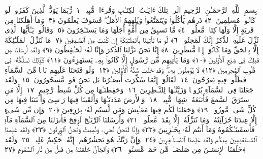 
  
    
  
    
    

\nopagebreak
  بِسمِ ٱللَّهِ ٱلرَّحمَـٰنِ ٱلرَّحِيمِ
  الٓر ۚ تِلكَ ءَايَـٰتُ ٱلكِتَـٰبِ وَقُرءَانٍۢ مُّبِينٍۢ ﴿١﴾
 رُّبَمَا يَوَدُّ ٱلَّذِينَ كَفَرُوا۟ لَو كَانُوا۟ مُسلِمِينَ ﴿٢﴾
 ذَرهُم يَأكُلُوا۟ وَيَتَمَتَّعُوا۟ وَيُلهِهِمُ ٱلأَمَلُ ۖ فَسَوفَ يَعلَمُونَ ﴿٣﴾
 وَمَآ أَهلَكنَا مِن قَريَةٍ إِلَّا وَلَهَا كِتَابٌۭ مَّعلُومٌۭ ﴿٤﴾
 مَّا تَسبِقُ مِن أُمَّةٍ أَجَلَهَا وَمَا يَستَـٔخِرُونَ ﴿٥﴾
 وَقَالُوا۟ يَـٰٓأَيُّهَا ٱلَّذِى نُزِّلَ عَلَيهِ ٱلذِّكرُ إِنَّكَ لَمَجنُونٌۭ ﴿٦﴾
 لَّو مَا تَأتِينَا بِٱلمَلَـٰٓئِكَةِ إِن كُنتَ مِنَ ٱلصَّـٰدِقِينَ ﴿٧﴾
 مَا نُنَزِّلُ ٱلمَلَـٰٓئِكَةَ إِلَّا بِٱلحَقِّ وَمَا كَانُوٓا۟ إِذًۭا مُّنظَرِينَ ﴿٨﴾
 إِنَّا نَحنُ نَزَّلنَا ٱلذِّكرَ وَإِنَّا لَهُۥ لَحَـٰفِظُونَ ﴿٩﴾
 وَلَقَد أَرسَلنَا مِن قَبلِكَ فِى شِيَعِ ٱلأَوَّلِينَ ﴿١٠﴾
 وَمَا يَأتِيهِم مِّن رَّسُولٍ إِلَّا كَانُوا۟ بِهِۦ يَستَهزِءُونَ ﴿١١﴾
 كَذَٟلِكَ نَسلُكُهُۥ فِى قُلُوبِ ٱلمُجرِمِينَ ﴿١٢﴾
 لَا يُؤمِنُونَ بِهِۦ ۖ وَقَد خَلَت سُنَّةُ ٱلأَوَّلِينَ ﴿١٣﴾
 وَلَو فَتَحنَا عَلَيهِم بَابًۭا مِّنَ ٱلسَّمَآءِ فَظَلُّوا۟ فِيهِ يَعرُجُونَ ﴿١٤﴾
 لَقَالُوٓا۟ إِنَّمَا سُكِّرَت أَبصَـٰرُنَا بَل نَحنُ قَومٌۭ مَّسحُورُونَ ﴿١٥﴾
 وَلَقَد جَعَلنَا فِى ٱلسَّمَآءِ بُرُوجًۭا وَزَيَّنَّـٰهَا لِلنَّـٰظِرِينَ ﴿١٦﴾
 وَحَفِظنَـٰهَا مِن كُلِّ شَيطَٰنٍۢ رَّجِيمٍ ﴿١٧﴾
 إِلَّا مَنِ ٱستَرَقَ ٱلسَّمعَ فَأَتبَعَهُۥ شِهَابٌۭ مُّبِينٌۭ ﴿١٨﴾
 وَٱلأَرضَ مَدَدنَـٰهَا وَأَلقَينَا فِيهَا رَوَٟسِىَ وَأَنۢبَتنَا فِيهَا مِن كُلِّ شَىءٍۢ مَّوزُونٍۢ ﴿١٩﴾
 وَجَعَلنَا لَكُم فِيهَا مَعَـٰيِشَ وَمَن لَّستُم لَهُۥ بِرَٰزِقِينَ ﴿٢٠﴾
 وَإِن مِّن شَىءٍ إِلَّا عِندَنَا خَزَآئِنُهُۥ وَمَا نُنَزِّلُهُۥٓ إِلَّا بِقَدَرٍۢ مَّعلُومٍۢ ﴿٢١﴾
 وَأَرسَلنَا ٱلرِّيَـٰحَ لَوَٟقِحَ فَأَنزَلنَا مِنَ ٱلسَّمَآءِ مَآءًۭ فَأَسقَينَـٰكُمُوهُ وَمَآ أَنتُم لَهُۥ بِخَـٰزِنِينَ ﴿٢٢﴾
 وَإِنَّا لَنَحنُ نُحىِۦ وَنُمِيتُ وَنَحنُ ٱلوَٟرِثُونَ ﴿٢٣﴾
 وَلَقَد عَلِمنَا ٱلمُستَقدِمِينَ مِنكُم وَلَقَد عَلِمنَا ٱلمُستَـٔخِرِينَ ﴿٢٤﴾
 وَإِنَّ رَبَّكَ هُوَ يَحشُرُهُم ۚ إِنَّهُۥ حَكِيمٌ عَلِيمٌۭ ﴿٢٥﴾
 وَلَقَد خَلَقنَا ٱلإِنسَـٰنَ مِن صَلصَـٰلٍۢ مِّن حَمَإٍۢ مَّسنُونٍۢ ﴿٢٦﴾
 وَٱلجَآنَّ خَلَقنَـٰهُ مِن قَبلُ مِن نَّارِ ٱلسَّمُومِ ﴿٢٧﴾
